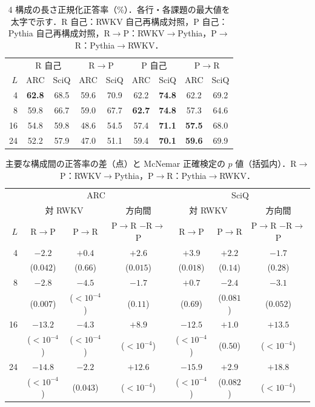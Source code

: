 \documentclass[techrep,noauthor]{ipsj}
\begin{document}
\begin{table}[!t]\centering\small
\caption{4 構成の長さ正規化正答率（\%）．各行・各課題の最大値を太字で示す．R 自己：RWKV 自己再構成対照，P 自己：Pythia 自己再構成対照，R$\to$P：RWKV$\to$Pythia，P$\to$R：Pythia$\to$RWKV．}\label{tab:direction}
\setlength{\tabcolsep}{2.4pt}
{
\begin{tabular}{rcccccccc}\toprule
& \multicolumn{2}{c}{R 自己} & \multicolumn{2}{c}{R$\to$P}
& \multicolumn{2}{c}{P 自己} & \multicolumn{2}{c}{P$\to$R}\\
\cmidrule(lr){2-3}\cmidrule(lr){4-5}\cmidrule(lr){6-7}\cmidrule(lr){8-9}
$L$ & ARC & SciQ & ARC & SciQ & ARC & SciQ & ARC & SciQ\\\midrule
4  & \textbf{62.8} & 68.5 & 59.6 & 70.9 & 62.2 & \textbf{74.8} & 62.2 & 69.2\\
8  & 59.8 & 66.7 & 59.0 & 67.7 & \textbf{62.7} & \textbf{74.8} & 57.3 & 64.6\\
16 & 54.8 & 59.8 & 48.6 & 54.5 & 57.4 & \textbf{71.1} & \textbf{57.5} & 68.0\\
24 & 52.2 & 57.9 & 47.0 & 51.1 & 59.4 & \textbf{70.1} & \textbf{59.6} & 69.9\\\bottomrule
\end{tabular}}
\end{table}

\begin{table}[!t]\centering\small
\caption{主要な構成間の正答率の差（点）と McNemar 正確検定の $p$ 値（括弧内）．R$\to$P：RWKV$\to$Pythia，P$\to$R：Pythia$\to$RWKV．}\label{tab:paired}
\setlength{\tabcolsep}{1.6pt}
{
\begin{tabular}{rcccccc}\toprule
& \multicolumn{3}{c}{ARC} & \multicolumn{3}{c}{SciQ}\\
\cmidrule(lr){2-4}\cmidrule(lr){5-7}
& \multicolumn{2}{c}{対 RWKV} & 方向間 & \multicolumn{2}{c}{対 RWKV} & 方向間\\
\cmidrule(lr){2-3}\cmidrule(lr){5-6}
$L$ & R$\to$P & P$\to$R & \shortstack{P$\to$R\\$-$R$\to$P} & R$\to$P & P$\to$R & \shortstack{P$\to$R\\$-$R$\to$P}\\\midrule
4 & $-2.2$ & $+0.4$ & $+2.6$ & $+3.9$ & $+2.2$ & $-1.7$\\
   & ($0.042$) & ($0.66$) & ($0.015$) & ($0.018$) & ($0.14$) & ($0.28$)\\[2pt]
8 & $-2.8$ & $-4.5$ & $-1.7$ & $+0.7$ & $-2.4$ & $-3.1$\\
   & ($0.007$) & ($<10^{-4}$) & ($0.11$) & ($0.69$) & ($0.081$) & ($0.052$)\\[2pt]
16 & $-13.2$ & $-4.3$ & $+8.9$ & $-12.5$ & $+1.0$ & $+13.5$\\
   & ($<10^{-4}$) & ($<10^{-4}$) & ($<10^{-4}$) & ($<10^{-4}$) & ($0.50$) & ($<10^{-4}$)\\[2pt]
24 & $-14.8$ & $-2.2$ & $+12.6$ & $-15.9$ & $+2.9$ & $+18.8$\\
   & ($<10^{-4}$) & ($0.043$) & ($<10^{-4}$) & ($<10^{-4}$) & ($0.082$) & ($<10^{-4}$)\\[2pt]
\bottomrule
\end{tabular}}
\end{table}
\end{document}
